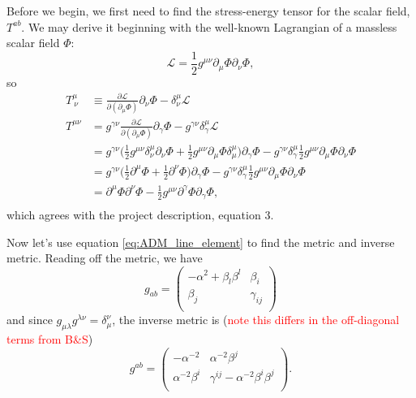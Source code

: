 \documentclass[12pt]{article}
\numberwithin{equation}{section}
\newcommand{\Lagr}{\mathcal{L}}
\newcommand{\redtext}[1]{\textcolor{red}{#1}}
\begin{document}
Before we begin, we first need to find the stress-energy tensor for the scalar field, $T^{ab}$.  We may derive it beginning with the well-known Lagrangian of a massless scalar field $\Phi$:
\begin{equation}
\Lagr = \frac{1}{2} g^{\mu \nu} \partial_\mu \Phi \partial_\nu \Phi,
\end{equation}
so
\begin{equation}
\begin{aligned}
T^{\mu}_{~\nu} &\equiv \frac{\partial \Lagr}{\partial (\partial_\mu \Phi)} \partial_\nu \Phi - \delta^\mu_\nu \Lagr \\
T^{\mu \nu} &= g^{\gamma \nu} \frac{\partial \Lagr}{\partial (\partial_\mu \Phi)} \partial_\gamma \Phi - g^{\gamma \nu} \delta^\mu_\gamma \Lagr \\
&= g^{\gamma \nu} \Big( \frac{1}{2} g^{\mu \nu} \delta^\mu_\nu \partial_\nu \Phi + \frac{1}{2} g^{\mu \nu} \partial_\mu \Phi \delta^\mu_\mu \Big) \partial_\gamma \Phi	 - g^{\gamma \nu} \delta^\mu_\gamma \frac{1}{2} g^{\mu \nu} \partial_\mu \Phi \partial_\nu \Phi \\
&= g^{\gamma \nu} \Big( \frac{1}{2} \partial^\mu \Phi + \frac{1}{2} \partial^\nu \Phi \Big) \partial_\gamma \Phi - g^{\gamma \nu} \delta^\mu_\gamma \frac{1}{2} g^{\mu \nu} \partial_\mu \Phi \partial_\nu \Phi \\
&= \partial^\mu \Phi \partial^\nu \Phi - \frac{1}{2} g^{\mu \nu} \partial^\gamma \Phi \partial_\gamma \Phi, \\
\end{aligned}
\end{equation}
which agrees with the project description, equation 3.

Now let's use equation \ref{eq:ADM_line_element} to find the metric and inverse metric.  Reading off the metric, we have
\begin{equation}
g_{ab} =
\begin{pmatrix}
-\alpha^{2} + \beta_l \beta^l & \beta_i \\
\beta_j & \gamma_{ij}  \\
\end{pmatrix}
\end{equation}
and since $g_{\mu \lambda} g^{\lambda \nu} = \delta^\nu_\mu$, the inverse metric is (\redtext{note this differs in the off-diagonal terms from B\&S})
\begin{equation}
g^{ab} = 
\begin{pmatrix}
-\alpha^{-2} & \alpha^{-2} \beta^j \\
\alpha^{-2} \beta^i & \gamma^{ij} - \alpha^{-2} \beta^{i} \beta^{j} \\
\end{pmatrix}.
\end{equation}
\end{document}
